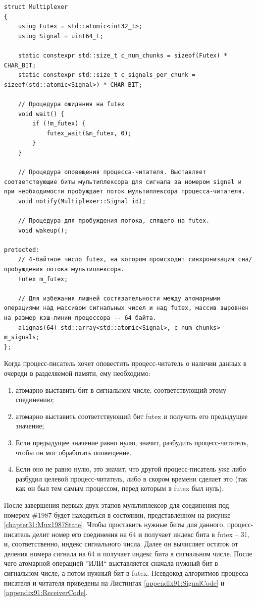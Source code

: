 \begin{lstlisting}[float=!h,caption={Структура мультиплексора в памяти},label={chapter31:MultiplexerStruct},frame=tlrb]
struct Multiplexer
{
    using Futex = std::atomic<int32_t>;
    using Signal = uint64_t;

    static constexpr std::size_t c_num_chunks = sizeof(Futex) * CHAR_BIT;
    static constexpr std::size_t c_signals_per_chunk = sizeof(std::atomic<Signal>) * CHAR_BIT;
	
	// Процедура ожидания на futex
    void wait() {
    	if (!m_futex) {
   			futex_wait(&m_futex, 0);
   		}
    }
	
	// Процедура оповещения процесса-читателя. Выставляет соответствующие биты мультиплексора для сигнала за номером signal и при необходимости пробуждает поток мультиплексора процесса-читателя.
    void notify(Multiplexer::Signal id);
    
    // Процедура для пробуждения потока, спящего на futex.
    void wakeup();

protected:
	// 4-байтное число futex, на котором происходит синхронизация сна/пробуждения потока мультиплексора.
    Futex m_futex;
	
	// Для избежания лишней состязательности между атомарными операциями над массивом сигнальных чисел и над futex, массив выровнен на размер кэш-линии процессора -- 64 байта.
    alignas(64) std::array<std::atomic<Signal>, c_num_chunks> m_signals;
};
\end{lstlisting}

Когда процесс-писатель хочет оповестить процесс-читатель о наличии данных в очереди в разделяемой памяти, ему необходимо:
\begin{enumerate}
\item атомарно выставить бит в сигнальном числе, соответствующий этому соединению;
\item атомарно выставить соответствующий бит futex и получить его предыдущее значение;
\item Если предыдущее значение равно нулю, значит, разбудить процесс-читатель, чтобы он мог обработать оповещение.
\item Если оно не равно нулю, это значит, что другой процесс-писатель уже либо разбудил целевой процесс-читатель, либо в скором времени сделает это (так как он был тем самым процессом, перед которым в futex был нуль).
\end{enumerate}

После завершения первых двух этапов мультиплексор для соединения под номером \#1987 будет находиться в состоянии, представленном на рисунке \ref{chapter31:Mux1987State}. Чтобы проставить нужные биты для данного, процесс-писатель делит номер его соединения на 64 и получает индекс бита в futex -- 31, и, соответственно, индекс сигнального числа. Далее он вычисляет остаток от деления номера сигнала на 64 и получает индекс бита в сигнальном числе. После чего атомарной операцией ''ИЛИ`` выставляется сначала нужный бит в сигнальном числе, а потом нужный бит в futex. Псевдокод алгоритмов процесса-писателя и читателя приведены на Листингах \ref{appendix91:SignalCode} и \ref{appendix91:ReceiverCode}.

